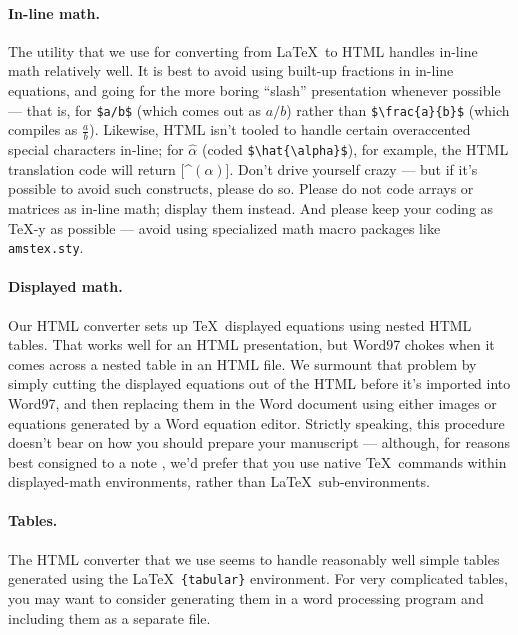 \documentclass[12pt]{article}
\begin{document}
\paragraph*{In-line math.}  The utility that we use for converting
from \LaTeX\ to HTML handles in-line math relatively well.  It is best
to avoid using built-up fractions in in-line equations, and going for
the more boring ``slash'' presentation whenever possible --- that is,
for \verb+$a/b$+ (which comes out as $a/b$) rather than
\verb+$\frac{a}{b}$+ (which compiles as $\frac{a}{b}$).  Likewise,
HTML isn't tooled to handle certain overaccented special characters
in-line; for $\hat{\alpha}$ (coded \verb+$\hat{\alpha}$+), for
example, the HTML translation code will return [\^{}$(\alpha)$].
Don't drive yourself crazy --- but if it's possible to avoid such
constructs, please do so.  Please do not code arrays or matrices as
in-line math; display them instead.  And please keep your coding as
\TeX-y as possible --- avoid using specialized math macro packages
like \texttt{amstex.sty}.

\paragraph*{Displayed math.} Our HTML converter sets up \TeX\
displayed equations using nested HTML tables.  That works well for an
HTML presentation, but Word97 chokes when it comes across a nested
table in an HTML file.  We surmount that problem by simply cutting the
displayed equations out of the HTML before it's imported into Word97,
and then replacing them in the Word document using either images or
equations generated by a Word equation editor.  Strictly speaking,
this procedure doesn't bear on how you should prepare your manuscript
--- although, for reasons best consigned to a note \cite{nattex}, we'd
prefer that you use native \TeX\ commands within displayed-math
environments, rather than \LaTeX\ sub-environments.

\paragraph*{Tables.}  The HTML converter that we use seems to handle
reasonably well simple tables generated using the \LaTeX\
\texttt{\{tabular\}} environment.  For very complicated tables, you
may want to consider generating them in a word processing program and
including them as a separate file.
\end{document}
